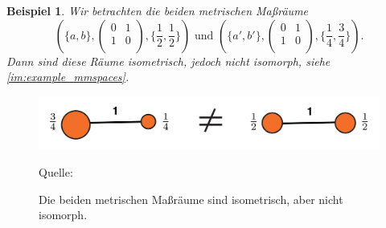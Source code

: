 \documentclass[twoside, 12pt,a4paper]{book}
\newcommand{\source}[1]{\caption*{\hfill Quelle: {#1}} }
\newtheorem{definition}[theorem]{Definition}
\newtheorem{example}[theorem]{Beispiel}
\numberwithin{equation}{section}
\begin{document}
	\begin{example}
		Wir betrachten die beiden metrischen Maßräume 
		\begin{equation}
		\left( \lbrace a,b \rbrace, \begin{pmatrix}
		0 & 1\\
		1 & 0 \\
		\end{pmatrix}, \lbrace \frac{1}{2},\frac{1}{2} \rbrace \right) \text{ und } 
		\left(\lbrace a',b' \rbrace, 
		\begin{pmatrix}
		0 & 1\\
		1 & 0 \\
		\end{pmatrix}, \lbrace \frac{1}{4},\frac{3}{4}\rbrace \right).
		\end{equation}
		\noindent Dann sind diese Räume isometrisch, jedoch nicht isomorph, siehe \autoref{im:example_mmspaces}.
	\end{example}
	
	\begin{figure}[ht]
		\centering
		\includegraphics[width=0.3\textheight]{example_mmspaces.png}
		\caption[Beispiel isometrischer metrischer Maßräume]{Die beiden metrischen Maßräume sind isometrisch, aber nicht isomorph.}
		\source{\cite{COTcuturi}}
		\label{im:example_mmspaces}
	\end{figure}
	

	
	
	
	

	
\end{document}
